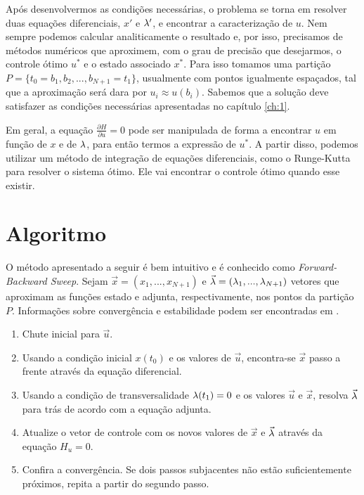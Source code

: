 Após desenvolvermos as condições necessárias, o problema se torna em resolver duas equações diferenciais, $x'$ e $\lambda '$, e encontrar a
caracterização de $u$. Nem sempre podemos calcular analiticamente o resultado
e, por isso, precisamos de métodos numéricos que aproximem, com o grau de
precisão que desejarmos, o controle ótimo $u^*$ e o estado associado $x^*$. 
Para isso tomamos uma partição $P = \{t_0 = b_1, b_2, ..., b_{N+1} = t_1\}$,
usualmente com pontos igualmente espaçados, tal que a aproximação será dara
por $u_i \approx u(b_i)$. Sabemos que a solução deve satisfazer as condições
necessárias apresentadas no capítulo \ref{ch:1}. 

Em geral, a equação $\frac{\partial H}{\partial u} = 0$ pode ser manipulada
de forma a encontrar $u$ em função de $x$ e de $\lambda$, para então termos a
expressão de $u^*$. A partir disso, podemos utilizar um método de integração
de equações diferenciais, como o Runge-Kutta para resolver o sistema ótimo.
Ele vai encontrar o controle ótimo quando esse existir. 

\section{Algoritmo}

O método apresentado a seguir é bem intuitivo e é conhecido como
\textit{Forward-Backward Sweep}. Sejam $\vec{x} = (x_1,...,x_{N+1})$ e
$\vec{\lambda} = (\lambda_1, ..., \lambda_{N+1})$ vetores que aproximam as funções estado
e adjunta, respectivamente, nos pontos da partição $P$. Informa\c{c}\~oes
sobre converg\^encia e estabilidade podem ser encontradas em \cite{wolfgang1978}. 

\begin{enumerate}[label=\textbf{Passo \arabic*:}]
    \item Chute inicial para $\vec{u}$. 
    \item Usando a condição inicial $x(t_0)$ e os valores de $\vec{u}$,
    encontra-se $\vec{x}$ passo a frente através da equação diferencial. 
    \item Usando a condição de transversalidade $\lambda(t_1) = 0$ e os valores
    $\vec{u}$ e $\vec{x}$, resolva $\vec{\lambda}$ para trás de acordo com a
    equação adjunta. 
    \item Atualize o vetor de controle com os novos valores de $\vec{x}$ e
    $\vec{\lambda}$ através da equação $H_u = 0$. 
    \item Confira a convergência. Se dois passos subjacentes não estão
    suficientemente próximos, repita a partir do segundo passo. 
\end{enumerate}

